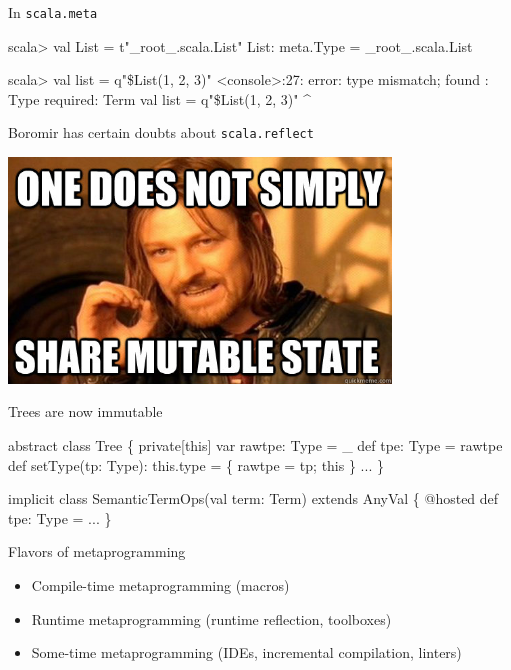 \documentclass[svgnames,dvipsnames,hyperref={bookmarks=false},usepdftitle=false]{beamer}
\begin{document}
\begin{frame}[fragile]{In \texttt{scala.meta}}
\begin{semiverbatim}
scala> val List = t"_root_.scala.List"
List: meta.Type = _root_.scala.List

scala> val list = q"\$List(1, 2, 3)"
<console>:27: error: type mismatch;
 found   : Type
 required: Term
              val list = q"\$List(1, 2, 3)"
                            ^
\end{semiverbatim}
\end{frame}

\begin{frame}[c, fragile]{Boromir has certain doubts about \texttt{scala.reflect}}
\begin{center}
\includegraphics[height=6cm]{mutable-state.jpg}
\end{center}
\end{frame}

\begin{frame}[fragile]{Trees are now immutable}
\begin{beforeblock}
abstract class Tree \{
  private[this] var rawtpe: Type = \_
  def tpe: Type = rawtpe
  def setType(tp: Type): this.type = \{ rawtpe = tp; this \}
  ...
\}
\end{beforeblock}
\pause
\begin{afterblock}
implicit class SemanticTermOps(val term: Term) extends AnyVal \{
  @hosted def tpe: Type = ...
\}
\end{afterblock}
\end{frame}


\begin{frame}{Flavors of metaprogramming}
\begin{itemize}
\item Compile-time metaprogramming (macros)
\item Runtime metaprogramming (runtime reflection, toolboxes)
\item Some-time metaprogramming (IDEs, incremental compilation, linters)
\end{itemize}
\end{frame}
\end{document}
